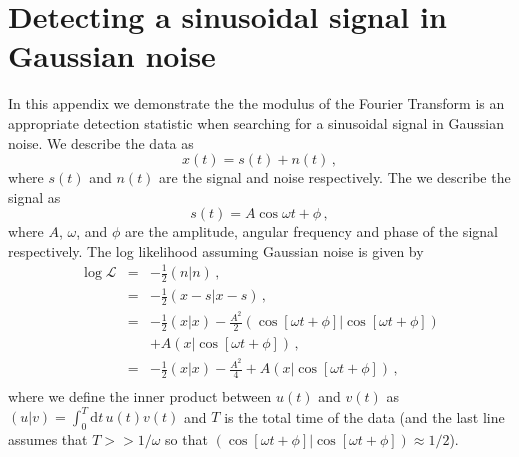 \documentclass[paper-main.tex]{subfiles}
\begin{document}





\section{Detecting a sinusoidal signal in Gaussian noise}
\label{app:sinusoid_likelihood}
In this appendix we demonstrate the the modulus of the Fourier Transform is an appropriate detection statistic when searching for a sinusoidal signal in Gaussian noise. 
We describe the data as
\begin{equation}
x(t) = s(t) + n(t)\,, 
\end{equation}
where $s(t)$ and $n(t)$ are the signal and noise respectively. 
The we describe the signal as 
\begin{equation}
s(t) = A \cos{\omega t + \phi}\,,
\end{equation}
where $A$, $\omega$, and $\phi$ are the amplitude, angular frequency and phase of the signal respectively. 
The log likelihood assuming Gaussian noise is given by
\begin{eqnarray}
\log \mathcal{L} &=& -\frac{1}{2}(n|n)\,, \\
                 &=& -\frac{1}{2}(x-s|x-s)\,, \\ 
                 &=& -\frac{1}{2}(x|x) - \frac{A^2}{2} (\cos[\omega t + \phi] | \cos[\omega t + \phi]) \\ &&+ A (x | \cos[\omega t +\phi])\,, \\ 
                 &=& -\frac{1}{2}(x|x) - \frac{A^2}{4} + A (x | \cos[\omega t +\phi])\,, \label{eqn:logLike}\\ 
\end{eqnarray}
where we define the inner product between $u(t)$ and $v(t)$ as $(u|v) = \int_0^T \mathrm{d} t \, u(t) v(t) $ and $T$ is the total time of the data (and the last line assumes that $T>>1/\omega$ so that $(\cos[\omega t + \phi] | \cos[\omega t + \phi])\approx{1/2}$). 
\end{document}
